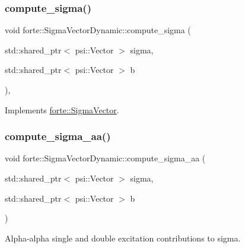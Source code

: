 \subsubsection{\texorpdfstring{compute\+\_\+sigma()}{compute\_sigma()}}
{\footnotesize\ttfamily void forte\+::\+Sigma\+Vector\+Dynamic\+::compute\+\_\+sigma (\begin{DoxyParamCaption}\item[{std\+::shared\+\_\+ptr$<$ psi\+::\+Vector $>$}]{sigma,  }\item[{std\+::shared\+\_\+ptr$<$ psi\+::\+Vector $>$}]{b }\end{DoxyParamCaption})\hspace{0.3cm}{\ttfamily [override]}, {\ttfamily [virtual]}}



Implements \mbox{\hyperlink{classforte_1_1_sigma_vector_afa184f816a37649a4e2316d62c8b621e}{forte\+::\+Sigma\+Vector}}.

\mbox{\label{classforte_1_1_sigma_vector_dynamic_aa56beb4165e25347cd21925d58ab5850}} 
\subsubsection{\texorpdfstring{compute\+\_\+sigma\+\_\+aa()}{compute\_sigma\_aa()}}
{\footnotesize\ttfamily void forte\+::\+Sigma\+Vector\+Dynamic\+::compute\+\_\+sigma\+\_\+aa (\begin{DoxyParamCaption}\item[{std\+::shared\+\_\+ptr$<$ psi\+::\+Vector $>$}]{sigma,  }\item[{std\+::shared\+\_\+ptr$<$ psi\+::\+Vector $>$}]{b }\end{DoxyParamCaption})\hspace{0.3cm}{\ttfamily [protected]}}



Alpha-\/alpha single and double excitation contributions to sigma. 

\mbox{\label{classforte_1_1_sigma_vector_dynamic_aff4d059b14d67c178e16fa981cf2f98b}} 
